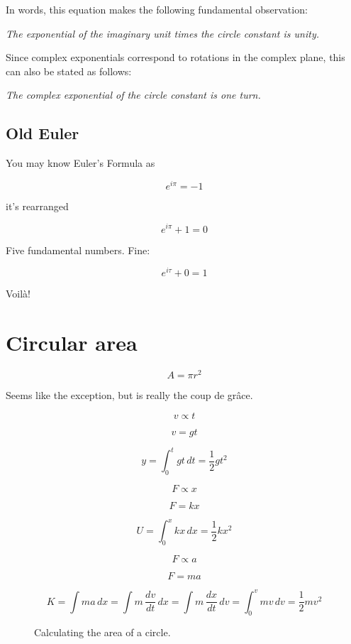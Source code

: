 \documentclass{article}
\begin{document}
In words, this equation makes the following fundamental observation: 

\begin{center}
\emph{The exponential of the imaginary unit times the circle constant is unity.} 
\end{center}

Since complex exponentials correspond to rotations in the complex plane, this can also be stated as follows:

\begin{center}
\emph{The complex exponential of the circle constant is one turn.}
\end{center}

  \subsection{Old Euler}

You may know Euler's Formula as 


\[ e^{i\pi} = -1 \]

it's rearranged

\[ e^{i\pi} + 1 = 0 \]

Five fundamental numbers. Fine:


\[ e^{i\tau} + 0 = 1 \]

Voil\`{a}!

\section{Circular area} %
\label{sec:circular_area}

\[ A = \pi r^2 \]


Seems like the exception, but is really the coup de gr\^{a}ce.

\[ v \propto t \]

\[ v = g t \]

\[ y = \int_0^t gt\,dt = \textstyle{\frac{1}{2}} gt^2 \]


\[ F \propto x \]

\[ F = k x \]

\[ U = \int_0^x kx\,dx = \textstyle{\frac{1}{2}} kx^2 \]

\[ F \propto a \]

\[ F = m a \]

\[ K = \int ma\,dx = \int m\,\frac{dv}{dt}\,dx = \int m\, \frac{dx}{dt}\,dv = \int_0^v mv\,dv = \textstyle{\frac{1}{2}} mv^2 \]


\begin{figure}
\begin{center}
\end{center}
\caption{Calculating the area of a circle.\label{fig:circular-area}}
\end{figure}
\end{document}
